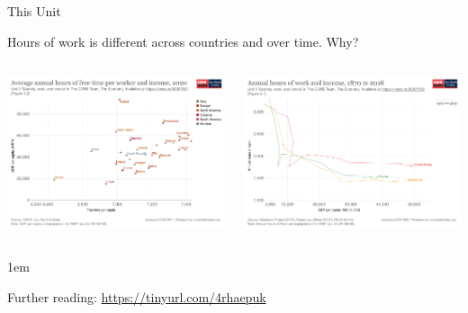 \documentclass[11pt,aspectratio=43,usenames,dvipsnames]{beamer}
\let\olditemize=\itemize
\let\endolditemize=\enditemize
\renewenvironment{itemize}{\olditemize \itemsep1em}{\endolditemize}
\theoremstyle{definition}
\begin{document}
\begin{frame}{This Unit}
\label{slide:This_Unit}
    \begin{center}
        Hours of work is different across countries and over time. Why?
    \end{center}
    \begin{columns}
        \begin{column}{0.5\textwidth}
            \includegraphics[width=\textwidth]{./figures/annual-hours-of-free-time-per-worker-and-income.png}
        \end{column}
        \begin{column}{0.5\textwidth}
            \includegraphics[width=\textwidth]{./figures/annual-hours-of-work-and-income-18702016.png}
        \end{column}
    \end{columns}

    \begin{itemize}
        \item Further reading: \url{https://tinyurl.com/4rhaepuk}
    \end{itemize}
\end{frame}
\end{document}

